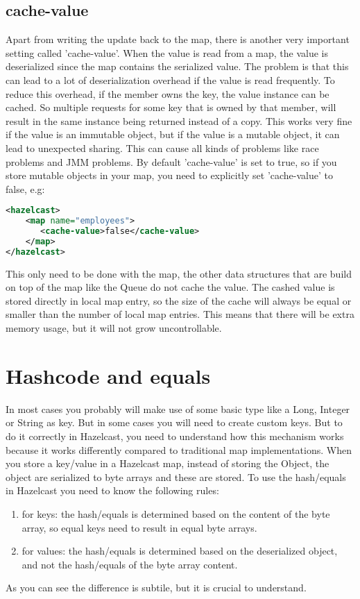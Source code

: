 \subsection*{cache-value}
Apart from writing the update back to the map, there is another very important setting called 'cache-value'. When the value is read from a map, the value is deserialized since the map contains the serialized value. The problem is that this can lead to a lot of deserialization overhead if the value is read frequently. To reduce this overhead, if the member owns the key, the value instance can be cached. So multiple requests for some key that is owned by that member, will result in the same instance being returned instead of a copy. This works very fine if the value is an immutable object, but if the value is a mutable object, it can lead to unexpected sharing. This can cause all kinds of problems like race problems and JMM problems. By default 'cache-value' is set to true, so if you store mutable objects in your map, you need to explicitly set 'cache-value' to false, e.g:
\begin{lstlisting}[language=xml]
<hazelcast>
    <map name="employees">
       <cache-value>false</cache-value>
    </map>
</hazelcast>
\end{lstlisting}
This only need to be done with the map, the other data structures that are build on top of the map like the Queue do not cache the value. The cashed value is stored directly in local map entry, so the size of the cache will always be equal or smaller than the number of local map entries. This means that there will be extra memory usage, but it will not grow uncontrollable.

\section{Hashcode and equals}
In most cases you probably will make use of some basic type like a Long, Integer or String as key. But in some cases you will need to create custom keys. But to do it correctly in Hazelcast, you need to understand how this mechanism works because it works differently compared to traditional map implementations. When you store a key/value in a Hazelcast map, instead of storing the Object, the object are serialized to byte arrays and these are stored. To use the hash/equals in Hazelcast you need to know the following rules:
\begin{enumerate}
\item for keys: the hash/equals is determined based on the content of the byte array, so equal keys need to result in equal byte arrays.
\item for values: the hash/equals is determined based on the deserialized object, and not the hash/equals of the byte array content. 
\end{enumerate}
As you can see the difference is subtile, but it is crucial to understand.

